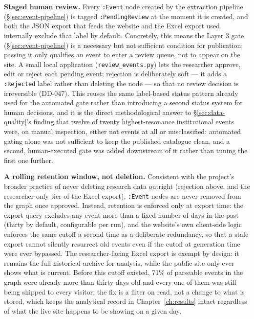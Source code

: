 \documentclass[12pt, a4paper]{report}
\begin{document}
\textbf{Staged human review.} Every \texttt{:Event} node created by the
extraction pipeline (\S\ref{sec:event-pipeline}) is tagged
\texttt{:PendingReview} at the moment it is created, and both the JSON
export that feeds the website and the Excel export used internally
exclude that label by default. Concretely, this means the Layer 3 gate
(\S\ref{sec:event-pipeline}) is a necessary but not sufficient condition
for publication: passing it only qualifies an event to enter a review
queue, not to appear on the site. A small local application
(\texttt{review\_events.py}) lets the researcher approve, edit or reject
each pending event; rejection is deliberately soft — it adds a
\texttt{:Rejected} label rather than deleting the node — so that no
review decision is irreversible (DD-047). This
reuses the same label-based status pattern already used for the
automated gate rather than introducing a second status system for human
decisions, and it is the direct methodological answer to
\S\ref{sec:data-quality}'s finding that twelve of twenty
highest-resonance institutional events were, on manual inspection, either
not events at all or misclassified: automated gating alone was not
sufficient to keep the published catalogue clean, and a second,
human-executed gate was added downstream of it rather than tuning the
first one further.

\textbf{A rolling retention window, not deletion.} Consistent with the
project's broader practice of never deleting research data outright
(rejection above, and the researcher-only tier of the Excel export),
\texttt{:Event} nodes are never removed from the graph once approved.
Instead, retention is enforced only at export time: the export query
excludes any event more than a fixed number of days in the past (thirty
by default, configurable per run), and the website's own client-side
logic enforces the same cutoff a second time as a deliberate redundancy,
so that a stale export cannot silently resurrect old events even if the
cutoff at generation time were ever bypassed. The researcher-facing Excel
export is exempt by design: it remains the full historical archive for
analysis, while the public site only ever shows what is current. Before
this cutoff existed, 71\% of parseable events in the graph were already
more than thirty days old and every one of them was still being shipped
to every visitor; the fix is a filter on read, not a change to what is
stored, which keeps the analytical record in Chapter~\ref{ch:results}
intact regardless of what the live site happens to be showing on a
given day.
\end{document}
